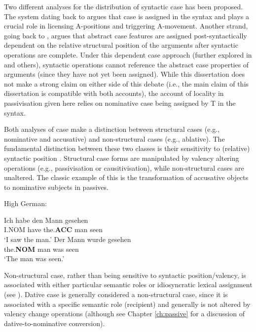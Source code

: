 Two different analyses for the distribution of syntactic case has been proposed. The system dating back to \cite{Vergnaud.1977} argues that case is assigned in the syntax and plays a crucial role in licensing A-positions and triggering A-movement. Another strand, going back to \cite{Yip.1987}, argues that abstract case features are assigned post-syntactically dependent on the relative structural position of the arguments after syntactic operations are complete. Under this dependent case approach (further explored in \citealt{Marantz.1991,McFadden.2004} and others), syntactic operations cannot reference the abstract case properties of arguments (since they have not yet been assigned). While this dissertation does not make a strong claim on either side of this debate (i.e., the main claim of this dissertation is compatible with both accounts), the account of locality in passivisation given here relies on nominative case being assigned by T in the syntax. 

Both analyses of case make a distinction between structural cases (e.g., nominative and accusative) and non-structural cases (e.g., ablative). The fundamental distinction between these two classes is their sensitivity to (relative) syntactic position \citep{Woolford.2006}. Structural case forms are manipulated by valency altering operations (e.g., passivisation or causitivisation), while non-structural cases are unaltered. The classic example of this is the transformation of accusative objects to nominative subjects in passives.

\begin{exe}
	\ex High German:\label{ex:hg-accnom}
	\begin{xlist}
		\ex \gll Ich habe den Mann gesehen\\
		I.NOM have the.\textbf{ACC} man seen\\
		\trans `I saw the man.'
		\ex \gll Der Mann wurde gesehen\\
		the.\textbf{NOM} man was seen\\
		\trans `The man was seen.'
	\end{xlist}
\end{exe}

Non-structural case, rather than being sensitive to syntactic position/valency, is associated with either particular semantic roles or idiosyncratic lexical assignment (see \citealt{Woolford.2006}). Dative case is generally considered a non-structural case, since it is associated with a specific semantic role (recipient) and generally is not altered by valency change operations (although see Chapter \ref{ch:passive} for a discussion of dative-to-nominative conversion).

